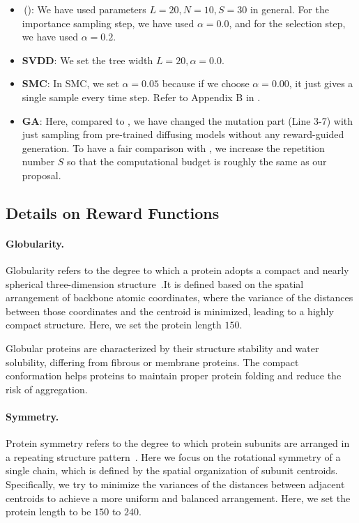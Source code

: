 \begin{itemize}
    \item \alg\,(): We have used parameters $L=20,N = 10,S=30$ in general. For the importance sampling step, we have used $\alpha = 0.0$, and for the selection step, we have used $\alpha = 0.2$. 
    \item \textbf{SVDD}: We set the tree width $L = 20,\alpha = 0.0$. 
    \item \textbf{SMC}: In SMC, we set $\alpha =0.05$ because if we choose $\alpha=0.00$, it just gives a single sample every time step. Refer to Appendix B in \citet{li2024derivative}.  
    \item \textbf{GA}: Here, compared to , we have changed the mutation part (Line 3-7) with just sampling from pre-trained diffusing models without any reward-guided generation. To have a fair comparison with \alg, we increase the repetition number $S$ so that the computational budget is roughly the same as our proposal.    
\end{itemize}


\subsection{Details on Reward Functions}

\paragraph{Globularity.} 
Globularity refers to the degree to which a protein adopts a compact and nearly spherical three-dimension structure~\citep{pace1975stability}.It is defined based on the spatial arrangement of backbone atomic coordinates, where the variance of the distances between those coordinates and the centroid is minimized, leading to a highly compact structure. Here, we set the protein length $150$. 

Globular proteins are characterized by their structure stability and water solubility, differing from fibrous or membrane proteins. The compact conformation helps proteins to maintain proper protein folding and reduce the risk of aggregation.

\paragraph{Symmetry.}
Protein symmetry refers to the degree to which protein subunits are arranged in a repeating structure pattern~\citep{goodsell2000structural,lisanza2024multistate,hie2022high}. Here we focus on the rotational symmetry of a single chain, which is defined by the spatial organization of subunit centroids. 
Specifically, we try to minimize the variances of the distances between adjacent centroids to achieve a more uniform and balanced arrangement. Here, we set the protein length to be $150$ to $240$. 

